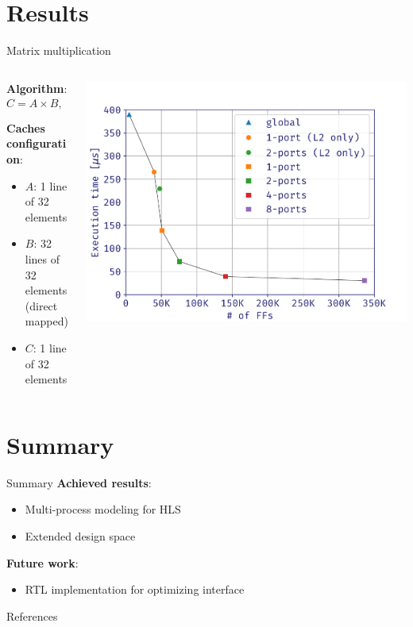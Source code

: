 \documentclass[aspectratio=169]{beamer}
\begin{document}
\section{Results}
\begin{frame}{Matrix multiplication}
	\begin{columns}
		\begin{column}{.5\textwidth}
			\textbf{Algorithm}:
			\[C = A \times B, \quad A, B, C \in \mathbb{R}^{32 \times 32}\]

			\textbf{Caches configuration}:
			\begin{itemize}
				\item $A$: 1 line of 32 elements
				\item $B$: 32 lines of 32 elements\\(direct mapped)
				\item $C$: 1 line of 32 elements
			\end{itemize}
		\end{column}
		\begin{column}{.5\textwidth}
			\begin{center}
				\includegraphics[width=\textwidth]{plot}
			\end{center}
		\end{column}
	\end{columns}
\end{frame}

\section{Summary}
\begin{frame}{Summary}
	\textbf{Achieved results}:
	\begin{itemize}
		\item Multi-process modeling for HLS
		\item Extended design space
	\end{itemize}

	\bigskip
	\textbf{Future work}:
	\begin{itemize}
		\item RTL implementation for optimizing interface
	\end{itemize}
\end{frame}

\begin{frame}{References}
	\nocite{*}
	\printbibliography[heading=none]
\end{frame}
\end{document}
